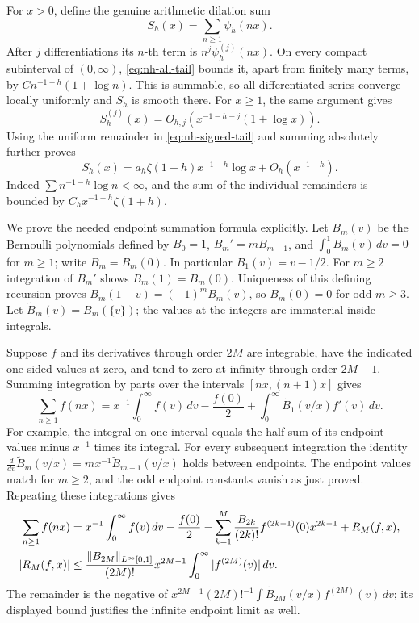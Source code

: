 For \(x>0\), define the genuine arithmetic dilation sum
\begin{equation}\label{eq:nh-S}
 S_h(x)=\sum_{n\ge1}\psi_h(nx).
\end{equation}
After \(j\) differentiations its \(n\)-th term is
\(n^j\psi_h^{(j)}(nx)\). On every compact subinterval of \((0,\infty)\),
\eqref{eq:nh-all-tail} bounds it, apart from finitely many terms, by
\(C n^{-1-h}(1+\log n)\). This is summable, so all differentiated
series converge locally uniformly and \(S_h\) is smooth there. For \(x\ge1\),
the same argument gives
\begin{equation}\label{eq:nh-S-all-tail}
 S_h^{(j)}(x)=O_{h,j}(x^{-1-h-j}(1+\log x)).
\end{equation}
Using the uniform remainder in \eqref{eq:nh-signed-tail} and summing
absolutely further proves
\begin{equation}\label{eq:nh-S-signed-tail}
 S_h(x)=a_h\zeta(1+h)x^{-1-h}\log x+O_h(x^{-1-h}).
\end{equation}
Indeed \(\sum n^{-1-h}\log n<\infty\), and the sum of the individual
remainders is bounded by \(C_hx^{-1-h}\zeta(1+h)\).

We prove the needed endpoint summation formula explicitly. Let
\(B_m(v)\) be the Bernoulli polynomials defined by \(B_0=1\),
\(B_m'=mB_{m-1}\), and \(\int_0^1B_m(v)\,dv=0\) for \(m\ge1\);
write \(B_m=B_m(0)\). In particular \(B_1(v)=v-1/2\).
For \(m\ge2\) integration of \(B_m'\) shows \(B_m(1)=B_m(0)\).
Uniqueness of this defining recursion proves
\(B_m(1-v)=(-1)^mB_m(v)\), so \(B_m(0)=0\) for odd \(m\ge3\).
Let \(\widetilde B_m(v)=B_m(\{v\})\); the values at the integers
are immaterial inside integrals.

Suppose \(f\) and its derivatives through order \(2M\) are integrable,
have the indicated one-sided values at zero, and tend to zero at infinity
through order \(2M-1\). Summing integration by parts over the intervals
\([nx,(n+1)x]\) gives
\[
 \sum_{n\ge1}f(nx)
 =x^{-1}\int_0^\infty f(v)\,dv-\frac{f(0)}2
       +\int_0^\infty\widetilde B_1(v/x)f'(v)\,dv .
\]
For example, the integral on one interval equals the half-sum of its
endpoint values minus \(x^{-1}\) times its integral. For every subsequent
integration the identity
\(\frac{d}{dv}\widetilde B_m(v/x)=
m x^{-1}\widetilde B_{m-1}(v/x)\) holds between endpoints.
The endpoint values match for \(m\ge2\), and the odd endpoint constants
vanish as just proved. Repeating these integrations gives
\begin{align}
 \sum_{n\ge1}f(nx)
 &=x^{-1}\int_0^\infty f(v)\,dv-\frac{f(0)}2
   -\sum_{k=1}^M\frac{B_{2k}}{(2k)!}
           f^{(2k-1)}(0)x^{2k-1}+R_M(f,x),\label{eq:nh-EM}\\
 |R_M(f,x)|&\le
 \frac{\|B_{2M}\|_{L^\infty[0,1]}}{(2M)!}
 x^{2M-1}\int_0^\infty|f^{(2M)}(v)|\,dv .\notag
\end{align}
The remainder is the negative of
\(x^{2M-1}(2M)!^{-1}\int\widetilde B_{2M}(v/x)f^{(2M)}(v)\,dv\);
its displayed bound justifies the infinite endpoint limit as well.


